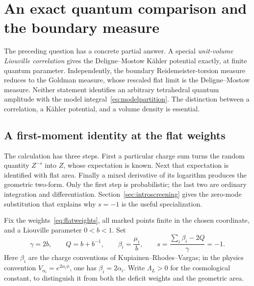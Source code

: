 \section{An exact quantum comparison and the boundary measure}
\label{sec:quantummeasure}

The preceding question has a concrete partial answer. A special
\emph{unit-volume Liouville correlation} gives the Deligne--Mostow
K\"ahler potential exactly, at finite quantum parameter. Independently,
the boundary Reidemeister-torsion measure reduces to the Goldman measure,
whose rescaled flat limit is the Deligne--Mostow measure. Neither
statement identifies an arbitrary tetrahedral quantum amplitude with
the model integral~\eqref{eq:modelpartition}. The distinction between a
correlation, a K\"ahler potential, and a volume density is essential.

\subsection{A first-moment identity at the flat weights}

The calculation has three steps. First a particular charge sum
turns the random quantity $Z^{-s}$ into $Z$, whose expectation is
known. Next that expectation is identified with flat area.
Finally a mixed derivative of its logarithm produces the geometric
two-form. Only the first step is probabilistic; the last two are
ordinary integration and differentiation. Section~\ref{sec:introscreening}
gives the zero-mode substitution that explains why $s=-1$ is the
useful specialization.

Fix the weights~\eqref{eq:flatweights}, all marked points finite in the
chosen coordinate, and a Liouville parameter $0<b<1$. Set
\begin{equation}
 \gamma=2b,\qquad Q=b+b^{-1},\qquad
 \beta_i=\frac{\mu_i}{b},\qquad
 s=\frac{\sum_i\beta_i-2Q}{\gamma}=-1.
 \label{eq:Liouvilleflatparameters}
\end{equation}
Here $\beta_i$ are the charge conventions of
Kupiainen--Rhodes--Vargas; in the physics convention
$V_{\alpha_i}=e^{2\alpha_i\phi}$, one has $\beta_i=2\alpha_i$.
Write $\Lambda_L>0$ for the cosmological constant, to distinguish it
from both the deficit weights and the geometric area.


